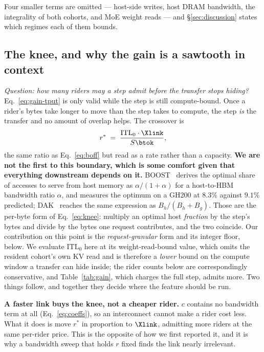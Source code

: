 Four smaller terms are omitted --- host-side writes, host DRAM bandwidth, the
integrality of both cohorts, and MoE weight reads --- and \S\ref{sec:discussion}
states which regimes each of them bounds.

\subsection{The knee, and why the gain is a sawtooth in context}
\label{sec:model:knee}

\emph{Question: how many riders may a step admit before the transfer stops hiding?}
Eq.~\ref{eq:gain-tput} is only valid while the step is still compute-bound. Once a
rider's bytes take longer to move than the step takes to compute, the step
\emph{is} the transfer and no amount of overlap helps. The crossover is
%
\begin{equation}
\label{eq:knee}
r^{*} \;=\; \frac{\mathrm{ITL}_0 \cdot \Xlink}{S \btok},
\end{equation}
%
the same ratio as Eq.~\ref{eq:boff} but read as a rate rather than a capacity.
\textbf{We are not the first to this boundary, which is some comfort given that
everything downstream depends on it.} BOOST~\cite{boost} derives the optimal share
of accesses to serve from host memory as $\alpha/(1{+}\alpha)$ for a host-to-HBM
bandwidth ratio $\alpha$, and measures the optimum on a GH200 at $8.3\%$ against
$9.1\%$ predicted; DAK~\cite{dak} reaches the same expression as
$B_h/(B_h{+}B_g)$. Those are the per-byte form of Eq.~\ref{eq:knee}: multiply an
optimal host \emph{fraction} by the step's bytes and divide by the bytes one request
contributes, and the two coincide. Our contribution on this point is the
\emph{request-granular} form and its integer floor, below. We
evaluate $\mathrm{ITL}_0$ here at its weight-read-bound value, which omits the
resident cohort's own KV read and is therefore a \emph{lower} bound on the compute
window a transfer can hide inside; the rider counts below are correspondingly
conservative, and Table~\ref{tab:gain}, which charges the full step, admits more.
Two things follow, and together they decide where the feature should be run.

\textbf{A faster link buys the knee, not a cheaper rider.} $c$ contains no
bandwidth term at all (Eq.~\ref{eq:coeffs}), so an interconnect cannot make a
rider cost less. What it does is move $r^{*}$ in proportion to $\Xlink$, admitting
more riders at the same per-rider price. This is the opposite of how we first
reported it, and it is why a bandwidth sweep that holds $r$ fixed finds the link
nearly irrelevant.

